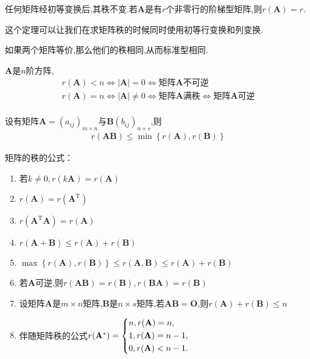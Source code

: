 \begin{ttheorem}
    任何矩阵经初等变换后,其秩不变.若$\mathbf{A}$是有$r$个非零行的阶梯型矩阵,则$r(\mathbf{A})=r$.
\end{ttheorem}

这个定理可以让我们在求矩阵秩的时候同时使用初等行变换和列变换.

如果两个矩阵等价,那么他们的秩相同,从而标准型相同.

\begin{ttheorem}
    $\mathbf{A}$是$n$阶方阵,
    \begin{gather*}
        r(\mathbf{A})<n \iff \left\lvert \mathbf{A}\right\rvert =0 \iff \text{矩阵$\mathbf{A}$不可逆}\\
        r(\mathbf{A})=n\iff \left\lvert \mathbf{A}\right\rvert \neq 0 \iff \text{矩阵$\mathbf{A}$满秩} \iff \text{矩阵$\mathbf{A}$可逆}\\
    \end{gather*}
\end{ttheorem}

\begin{ttheorem}
    设有矩阵$\mathbf{A}=(a_{ij})_{m\times n}$与$\mathbf{B}(b_{ij})_{n\times s}$,则
    \begin{gather*}
        r(\mathbf{A}\mathbf{B})\leqslant \min\left\{r(\mathbf{A}),r(\mathbf{B})\right\} 
    \end{gather*}
\end{ttheorem}

矩阵的秩的公式：
\begin{enumerate}
    \item 若$k\neq 0,r(k \mathbf{A})=r(\mathbf{A})$
    \item $r(\mathbf{A})=r(\mathbf{A}^\mathrm{T})$
    \item $r(\mathbf{A}^\mathrm{T}\mathbf{A})=r(\mathbf{A})$
    \item $r(\mathbf{A}+\mathbf{B}) \leqslant r(\mathbf{A})+r(\mathbf{B})$
    \item $\max\left\{r(\mathbf{A}),r(\mathbf{B})\right\} \leqslant r(\mathbf{A},\mathbf{B})\leqslant r(\mathbf{A})+r(\mathbf{B})$
    \item 若$\mathbf{A}$可逆,则$r(\mathbf{A}\mathbf{B})=r(\mathbf{B}),r(\mathbf{B}\mathbf{A})=r(\mathbf{B})$
    \item 设矩阵$\mathbf{A}$是$m\times n$矩阵,$\mathbf{B}$是$n\times s$矩阵,若$\mathbf{A}\mathbf{B}=\mathbf{O}$,则$r(\mathbf{A})+r(\mathbf{B}) \leqslant n$
    \item 伴随矩阵秩的公式$r(\mathbf{A}^*)=\begin{dcases}
    n,r(\mathbf{A})=n,\\
    1,r(\mathbf{A})=n-1,\\
    0,r(\mathbf{A})<n-1.
    \end{dcases}$
\end{enumerate}

